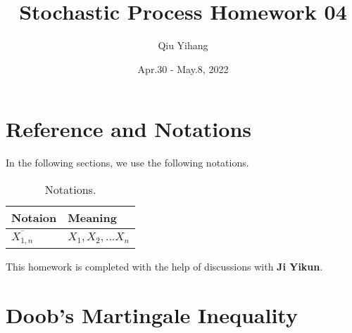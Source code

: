 \documentclass{article}
\title{\textbf{Stochastic Process Homework 04}}
\author{Qiu Yihang}
\date{Apr.30 - May.8, 2022}
\begin{document}
\maketitle

\setcounter{section}{-1}
\section{Reference and Notations}

\hspace{2em}
In the following sections, we use the following notations.

\vspace{-0.6em}
\begin{table}[htbp]
    \centering
    \begin{tabular}{ll}
        \hline
        Notaion & Meaning \\
        \hline 
        $\overline{X_{1,n}}$ & $X_1,X_2,...X_n$ \\
        \hline
\end{tabular}
\caption{Notations.}
\end{table}

\vspace{-0.5em} \hspace{0.7em}
This homework is completed with the help of discussions with \textbf{Ji Yikun}.

\vspace{1em}
\section{Doob's Martingale Inequality}
\vspace{1em}
\end{document}
